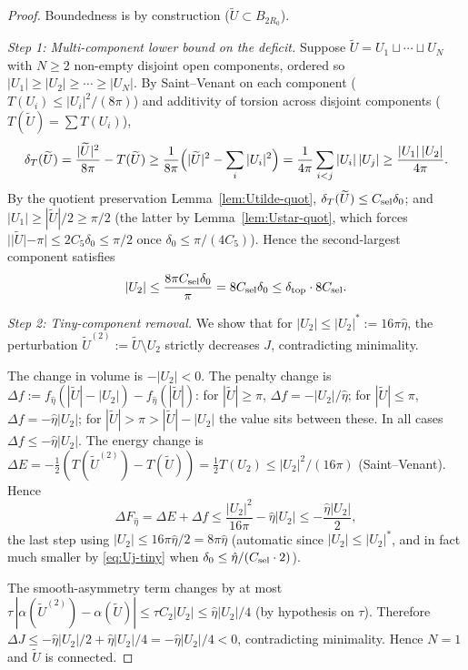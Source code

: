 \documentclass[11pt]{amsart}
\newcommand{\dT}{\delta_T}
\newcommand{\wt}{\widetilde}
\begin{document}
\begin{proof}
Boundedness is by construction (\(\wt U\subset B_{2R_0}\)).

\emph{Step 1: Multi-component lower bound on the deficit.}
Suppose \(\wt U=U_1\sqcup\cdots\sqcup U_N\) with \(N\ge 2\) non-empty
disjoint open components, ordered so \(|U_1|\ge|U_2|\ge\cdots\ge
|U_N|\).  By Saint--Venant on each component
(\(T(U_i)\le|U_i|^{2}/(8\pi)\)) and additivity of torsion across
disjoint components (\(T(\wt U)=\sum T(U_i)\)),
\begin{equation}\label{eq:multi-comp-SV}
   \dT(\wt U)=\frac{|\wt U|^{2}}{8\pi}-T(\wt U)
      \ge\frac{1}{8\pi}\Bigl(|\wt U|^{2}-\sum_i|U_i|^{2}\Bigr)
      =\frac{1}{4\pi}\sum_{i<j}|U_i|\,|U_j|
      \ge\frac{|U_1|\,|U_2|}{4\pi}.
\end{equation}
By the quotient preservation Lemma~\ref{lem:Utilde-quot},
\(\dT(\wt U)\le C_{\rm sel}\delta_0\); and \(|U_1|\ge|\wt U|/2\ge
\pi/2\) (the latter by Lemma~\ref{lem:Ustar-quot}, which forces
\(||\wt U|-\pi|\le 2C_5\delta_0\le\pi/2\) once
\(\delta_0\le\pi/(4C_5)\)).  Hence the second-largest component
satisfies
\begin{equation}\label{eq:Uj-tiny}
   |U_2|\le\frac{8\pi C_{\rm sel}\delta_0}{\pi}=8 C_{\rm sel}\delta_0
   \le\delta_{\rm top}\cdot 8C_{\rm sel}.
\end{equation}

\emph{Step 2: Tiny-component removal.}  We show that for
\(|U_2|\le|U_2|^*:=16\pi\hat\eta\), the perturbation
\(\wt U^{(2)}:=\wt U\setminus U_2\) strictly decreases \(J\),
contradicting minimality.

The change in volume is \(-|U_2|<0\).  The penalty change is
\(\Delta f:=f_{\hat\eta}(|\wt U|-|U_2|)-f_{\hat\eta}(|\wt U|)\): for
\(|\wt U|\ge\pi\), \(\Delta f=-|U_2|/\hat\eta\); for
\(|\wt U|\le\pi\), \(\Delta f=-\hat\eta|U_2|\); for \(|\wt U|>\pi>
|\wt U|-|U_2|\) the value sits between these.  In all cases
\(\Delta f\le-\hat\eta|U_2|\).  The energy change is
\(\Delta E=-\tfrac12(T(\wt U^{(2)})-T(\wt U))=\tfrac12 T(U_2)\le
|U_2|^{2}/(16\pi)\) (Saint--Venant).  Hence
\[
   \Delta F_{\hat\eta}=\Delta E+\Delta f
      \le\frac{|U_2|^{2}}{16\pi}-\hat\eta|U_2|
      \le-\frac{\hat\eta|U_2|}{2},
\]
the last step using \(|U_2|\le 16\pi\hat\eta/2=8\pi\hat\eta\)
(automatic since \(|U_2|\le|U_2|^*\), and in fact much smaller by
\eqref{eq:Uj-tiny} when \(\delta_0\le\hat\eta/(C_{\rm sel}\cdot 2)\)).

The smooth-asymmetry term changes by at most
\(\tau\,|\alpha(\wt U^{(2)})-\alpha(\wt U)|\le\tau C_2|U_2|\le
\hat\eta|U_2|/4\) (by hypothesis on \(\tau\)).  Therefore
\(\Delta J\le-\hat\eta|U_2|/2+\hat\eta|U_2|/4=-\hat\eta|U_2|/4<0\),
contradicting minimality.  Hence \(N=1\) and \(\wt U\) is connected.


\end{proof}
\end{document}
